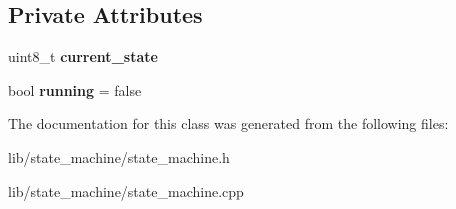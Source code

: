 \subsection*{Private Attributes}
\begin{DoxyCompactItemize}
\item 
uint8\+\_\+t {\bfseries current\+\_\+state}\hypertarget{class_state_machine_abdcd9426d9a2ec9e2d703c74cd3299df}{}\label{class_state_machine_abdcd9426d9a2ec9e2d703c74cd3299df}

\item 
bool {\bfseries running} = false\hypertarget{class_state_machine_adc6939485a12a6250df3cc65aa172d2a}{}\label{class_state_machine_adc6939485a12a6250df3cc65aa172d2a}

\end{DoxyCompactItemize}


The documentation for this class was generated from the following files\+:\begin{DoxyCompactItemize}
\item 
lib/state\+\_\+machine/state\+\_\+machine.\+h\item 
lib/state\+\_\+machine/state\+\_\+machine.\+cpp\end{DoxyCompactItemize}
